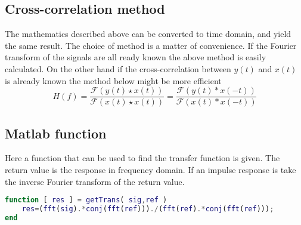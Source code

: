 \subsection{Cross-correlation method}
The mathematics described above can be converted to time domain, and yield the same result. The choice of method is a matter of convenience. If the Fourier transform of the signals are all ready known the above method is easily calculated. On the other hand if the cross-correlation between $y(t)$ and $x(t)$ is already known the method below might be more efficient
\begin{equation}
H(f)=\dfrac{\mathscr{F}(y(t)\star x(t))} {\mathscr{F}(x(t)\star x(t))}=
\dfrac{\mathscr{F}(y(t)\ast x(-t))} {\mathscr{F}(x(t)\ast x(-t))}
\label{Eq:Xcorr method}
\end{equation}  
 
 \subsection{Matlab function}
 Here a function that can be used to find the transfer function is given. The return value is the response in frequency domain. If an impulse response is take the inverse Fourier transform of the return value. 
 \begin{lstlisting}[language=MATLAB, caption=getTrans.m]
function [ res ] = getTrans( sig,ref )
	res=(fft(sig).*conj(fft(ref)))./(fft(ref).*conj(fft(ref)));
end
 \end{lstlisting} 
